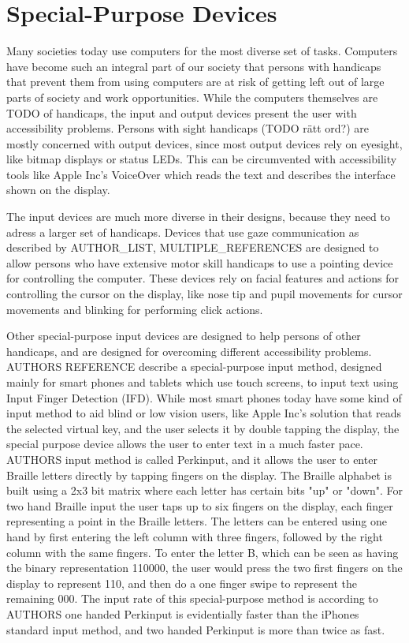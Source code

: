 \section{Special-Purpose Devices}

Many societies today use computers for the most diverse set of tasks. Computers have become such an integral part of our society that persons with handicaps that prevent them from using computers are at risk of getting left out of large parts of society and work opportunities. While the computers themselves are TODO of handicaps, the input and output devices present the user with accessibility problems. Persons with sight handicaps (TODO rätt ord?) are mostly concerned with output devices, since most output devices rely on eyesight, like bitmap displays or status LEDs. This can be circumvented with accessibility tools like Apple Inc's VoiceOver which reads the text and describes the interface shown on the display.

The input devices are much more diverse in their designs, because they need to adress a larger set of handicaps. Devices that use gaze communication as described by AUTHOR_LIST, MULTIPLE_REFERENCES are designed to allow persons who have extensive motor skill handicaps to use a pointing device for controlling the computer. These devices rely on facial features and actions for controlling the cursor on the display, like nose tip and pupil movements for cursor movements and blinking for performing click actions.

Other special-purpose input devices are designed to help persons of other handicaps, and are designed for overcoming different accessibility problems. AUTHORS REFERENCE describe a special-purpose input method, designed mainly for smart phones and tablets which use touch screens, to input text using Input Finger Detection (IFD). While most smart phones today have some kind of input method to aid blind or low vision users, like Apple Inc's solution that reads the selected virtual key, and the user selects it by double tapping the display, the special purpose device allows the user to enter text in a much faster pace. AUTHORS input method is called Perkinput, and it allows the user to enter Braille letters directly by tapping fingers on the display. The Braille alphabet is built using a 2x3 bit matrix where each letter has certain bits "up" or "down". For two hand Braille input the user taps up to six fingers on the display, each finger representing a point in the Braille letters. The letters can be entered using one hand by first entering the left column with three fingers, followed by the right column with the same fingers. To enter the letter B, which can be seen as having the binary representation 110000, the user would press the two first fingers on the display to represent 110, and then do a one finger swipe to represent the remaining 000. The input rate of this special-purpose method is according to AUTHORS one handed Perkinput is evidentially faster than the iPhones standard input method, and two handed Perkinput is more than twice as fast.


